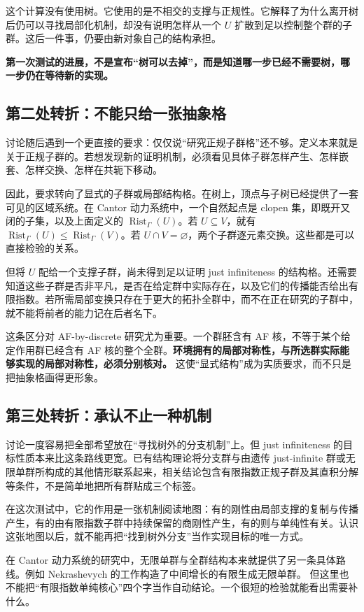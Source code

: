 \documentclass[UTF8,zihao=-4,fontset=none,oneside,openany]{ctexbook}
\newcommand{\Rist}{\operatorname{Rist}}
\begin{document}
这个计算没有使用树。它使用的是不相交的支撑与正规性。它解释了为什么离开树后仍可以寻找局部化机制，却没有说明怎样从一个 $U$ 扩散到足以控制整个群的子群。这后一件事，仍要由新对象自己的结构承担。

\textbf{第一次测试的进展，不是宣布“树可以去掉”，而是知道哪一步已经不需要树，哪一步仍在等待新的实现。}

\subsection*{第二处转折：不能只给一张抽象格}
讨论随后遇到一个更直接的要求：仅仅说“研究正规子群格”还不够。定义本来就是关于正规子群的。若想发现新的证明机制，必须看见具体子群怎样产生、怎样嵌套、怎样交换、怎样在共轭下移动。

因此，要求转向了显式的子群或局部结构格。在树上，顶点与子树已经提供了一套可见的区域系统。在 Cantor 动力系统中，一个自然起点是 clopen 集，即既开又闭的子集，以及上面定义的 $\Rist_\Gamma(U)$。若 $U\subseteq V$，就有 $\Rist_\Gamma(U)\leq\Rist_\Gamma(V)$。若 $U\cap V=\varnothing$，两个子群逐元素交换。这些都是可以直接检验的关系。

但将 $U$ 配给一个支撑子群，尚未得到足以证明 just infiniteness 的结构格。还需要知道这些子群是否非平凡，是否在给定群中实际存在，以及它们的传播能否给出有限指数。若所需局部变换只存在于更大的拓扑全群中，而不在正在研究的子群中，就不能将前者的能力记在后者名下。

这条区分对 AF-by-discrete 研究尤为重要。一个群胚含有 AF 核，不等于某个给定作用群已经含有 AF 核的整个全群。\textbf{环境拥有的局部对称性，与所选群实际能够实现的局部对称性，必须分别核对。} 这使“显式结构”成为实质要求，而不只是把抽象格画得更形象。

\subsection*{第三处转折：承认不止一种机制}
讨论一度容易把全部希望放在“寻找树外的分支机制”上。但 just infiniteness 的目标性质本来比这条路线更宽。已有结构理论将分支群与由遗传 just-infinite 群或无限单群所构成的其他情形联系起来，相关结论包含有限指数正规子群及其直积分解等条件，不是简单地把所有群贴成三个标签。\cite[Theorem~5.6]{bgs03}

在这次测试中，它的作用是一张机制阅读地图：有的刚性由局部支撑的复制与传播产生，有的由有限指数子群中持续保留的商刚性产生，有的则与单纯性有关。认识这张地图以后，就不能再把“找到树外分支”当作实现目标的唯一方式。

在 Cantor 动力系统的研究中，无限单群与全群结构本来就提供了另一条具体路线。例如 Nekrashevych 的工作构造了中间增长的有限生成无限单群。\cite{nek18} 但这里也不能把“有限指数单纯核心”四个字当作自动结论。一个很短的检验就能看出需要补什么。
\end{document}
